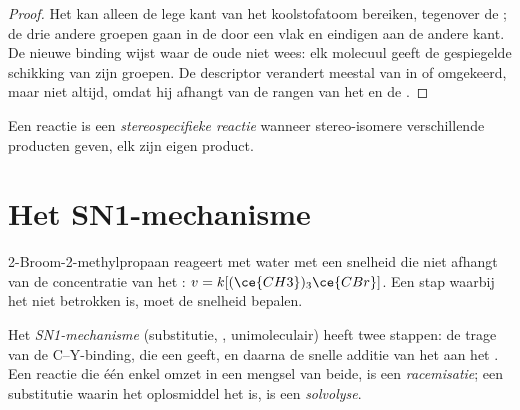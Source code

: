 \begin{proof}
Het  kan alleen de lege kant van het koolstofatoom bereiken,
tegenover de ; de drie andere groepen gaan in de
 door een vlak en eindigen aan de andere kant. De nieuwe
binding wijst waar de oude niet wees: elk molecuul  geeft de
gespiegelde schikking van zijn groepen. De descriptor verandert meestal
van  in  of omgekeerd, maar niet altijd, omdat hij afhangt
van de rangen van het  en de .
\end{proof}

\begin{definition}\label{def:b1:nucleophilic-substitution:stereospecific}
Een reactie is een
\emph{stereospecifieke reactie}
wanneer stereo-isomere   verschillende producten
geven, elk  zijn eigen product.
\end{definition}

\section{Het SN1-mechanisme}

2-Broom-2-methylpropaan reageert met water met een snelheid die niet
afhangt van de concentratie van het : $v = k[(\ce{CH3})_3\ce{CBr}]$.
Een stap waarbij het  niet betrokken is, moet de snelheid
bepalen.

\begin{definition}\label{def:b1:nucleophilic-substitution:sn1}
Het \emph{SN1-mechanisme} (substitutie, ,
unimoleculair) heeft twee stappen: de trage  van de
C--Y-binding, die een  geeft, en daarna de snelle additie van
het  aan het . Een reactie die één enkel 
omzet in een mengsel van beide, is een
\emph{racemisatie}; een substitutie waarin het
oplosmiddel het  is, is een \emph{solvolyse}.
\end{definition}

